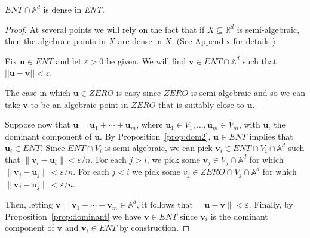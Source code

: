\begin{corollary}
$\mathit{ENT}\cap\mathbb{A}^d$ is dense in \textit{ENT}.
\label{corl:dense}
\end{corollary}

\begin{proof}
  At several points we will rely on the fact that if
  $X\subseteq\mathbb{R}^d$ is semi-algebraic, then the algebraic
  points in $X$ are dense in $X$.  (See Appendix for details.)

  Fix $\boldsymbol u\in\mathit{ENT}$ and let $\varepsilon>0$ be
  given. We will find $\boldsymbol v\in \mathit{ENT}\cap \mathbb{A}^d$
  such that $||\boldsymbol u-\boldsymbol v||<\varepsilon$.

  The case in which $\boldsymbol u \in \mathit{ZERO}$ is easy since
  $\mathit{ZERO}$ is semi-algebraic and so we can take $\boldsymbol v$
  to be an algebraic point in $\mathit{ZERO}$ that is suitably close
  to $\boldsymbol u$.

  Suppose now that $\boldsymbol u=\boldsymbol u_1+\cdots+\boldsymbol
  u_m$, where $\boldsymbol u_1\in V_1,\ldots,\boldsymbol u_m\in V_m$,
  with $\boldsymbol u_i$ the dominant component of $\boldsymbol u$. By
  Proposition~\ref{prop:dom2}, $\boldsymbol u\in\mathit{ENT}$ implies
  that $\boldsymbol u_i\in \mathit{ENT}$. Since $\mathit{ENT}\cap V_i$
  is semi-algebraic, we can pick $\boldsymbol v_i\in \mathit{ENT}\cap
  V_i\cap\mathbb{A}^d$ such that $\| \boldsymbol v_i -\boldsymbol u_i
  \|<\varepsilon/n$. For each $j>i$, we pick some $\boldsymbol v_j\in
  V_j\cap \mathbb{A}^d$ for which $\| \boldsymbol v_j - \boldsymbol
  u_j\|<\varepsilon/n$.  For each $j<i$ we pick some $v_j \in
  \mathit{ZERO}\cap V_j\cap \mathbb{A}^d$ for which $\| \boldsymbol
  v_j - \boldsymbol u_j\|<\varepsilon/n$.

  Then, letting $\boldsymbol v=\boldsymbol v_1+\cdots+\boldsymbol v_m
  \in \mathbb{A}^d$, it follows that $\|\boldsymbol u-\boldsymbol
  v\|<\varepsilon$.  Finally, by Proposition~\ref{prop:dominant} we
  have $\boldsymbol v\in\mathit{ENT}$ since $\boldsymbol v_i$ is the
  dominant component of $\boldsymbol v$ and $\boldsymbol v_i \in
  \mathit{ENT}$ by construction.
\end{proof}
